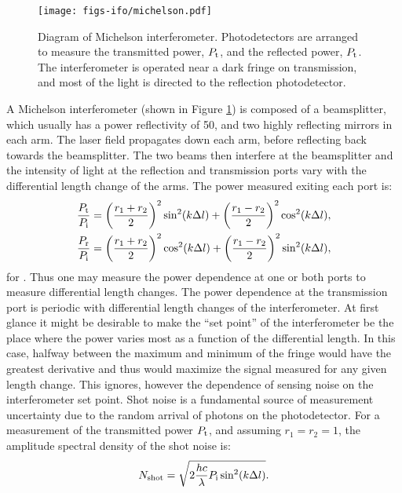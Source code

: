 \begin{figure}
  \begin{center}
  \leavevmode
  \texttt{[image: figs-ifo/michelson.pdf]}
  \end{center}
  \caption[Diagram of a Michelson interferometer.]{Diagram of Michelson interferometer. Photodetectors are arranged to measure the transmitted power, $P_{\rm t}$, and the reflected power, $P_{\rm t}$. The interferometer is operated near a dark fringe on transmission, and most of the light is directed to the reflection photodetector.}
  \label{fig:michelson}
\end{figure}

A Michelson interferometer (shown in Figure \ref{fig:michelson}) is composed of a beamsplitter, which usually has a power reflectivity of 50\perc{}, and two highly reflecting mirrors in each arm. %
The laser field propagates down each arm, before reflecting back towards the beamsplitter. %
The two beams then interfere at the beamsplitter and the intensity of light at the reflection and transmission ports vary with the differential length change of the arms. %
The power measured exiting each port is:
\begin{align}
\frac{P_{\rm{t}}}{P_{\rm{i}}} &= \left(\frac{r_1+r_2}{2}\right)^2\sin^2(k\Delta l)+\left(\frac{r_1-r_2}{2}\right)^2\cos^2(k\Delta l),\\
\frac{P_{\rm{r}}}{P_{\rm{i}}} &= \left(\frac{r_1+r_2}{2}\right)^2\cos^2(k\Delta l)+\left(\frac{r_1-r_2}{2}\right)^2\sin^2(k\Delta l),
\end{align}
for . %
Thus one may measure the power dependence at one or both ports to measure differential length changes. %
The power dependence at the transmission port is periodic with differential length changes of the interferometer. %
At first glance it might be desirable to make the ``set point'' %
of the interferometer be the place where the power varies most as a function of the differential length. %
In this case, halfway between the maximum and minimum of the fringe would have the greatest derivative and thus would maximize the signal measured for any given length change. %
This ignores, however the dependence of sensing noise on the interferometer set point. %
Shot noise is a fundamental source of measurement uncertainty due to the random arrival of photons on the photodetector. %
For a measurement of the transmitted power $P_{\rm t}$, and assuming $r_1=r_2=1$, the amplitude spectral density of the shot noise is:
\begin{equation}
N_{\rm{shot}}=\sqrt{2\frac{hc}{\lambda}P_{\rm i}\sin^2(k\Delta l)}.
\end{equation}
